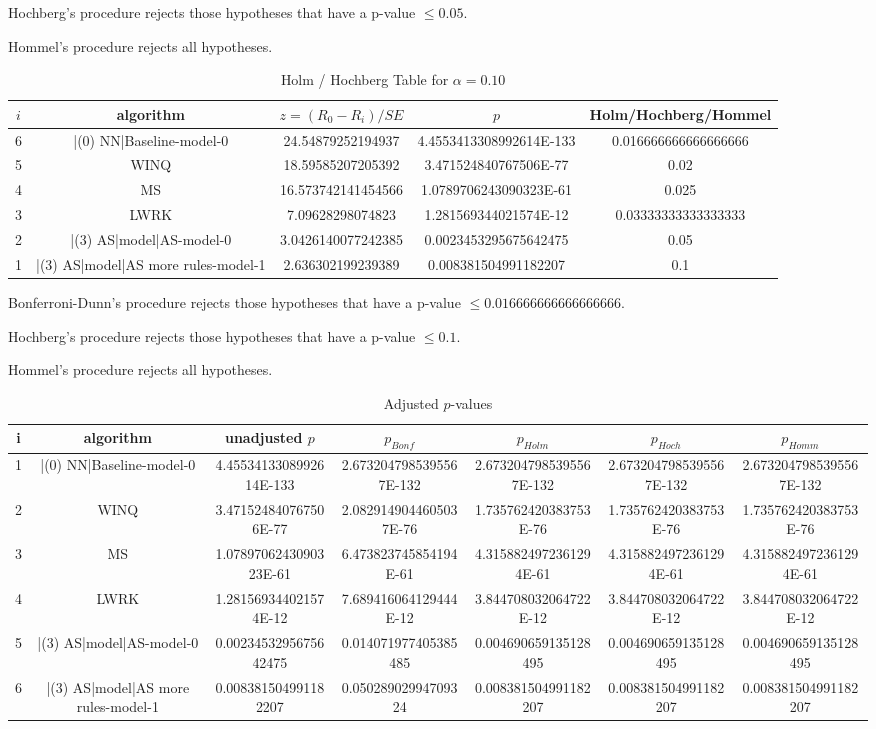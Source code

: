 \documentclass[a3paper,10pt]{article}
\begin{document}
Hochberg's procedure rejects those hypotheses that have a p-value $\le0.05$.


Hommel's procedure rejects all hypotheses.


\begin{table}[!htp]
\centering\tiny
\caption{Holm / Hochberg Table for $\alpha=0.10$}
\begin{tabular}{ccccc}
$i$&algorithm&$z=(R_0 - R_i)/SE$&$p$&Holm/Hochberg/Hommel\\
\hline
6&|(0) NN|Baseline-model-0&24.54879252194937&4.4553413308992614E-133&0.016666666666666666\\
5&WINQ&18.59585207205392&3.471524840767506E-77&0.02\\
4&MS&16.573742141454566&1.0789706243090323E-61&0.025\\
3&LWRK&7.09628298074823&1.281569344021574E-12&0.03333333333333333\\
2&|(3) AS|model|AS-model-0&3.0426140077242385&0.0023453295675642475&0.05\\
1&|(3) AS|model|AS more rules-model-1&2.636302199239389&0.008381504991182207&0.1\\
\hline
\end{tabular}
\end{table}
Bonferroni-Dunn's procedure rejects those hypotheses that have a p-value $\le0.016666666666666666$.


Hochberg's procedure rejects those hypotheses that have a p-value $\le0.1$.


Hommel's procedure rejects all hypotheses.


\begin{table}[!htp]
\centering\tiny
\caption{Adjusted $p$-values}
\begin{tabular}{ccccccc}
i&algorithm&unadjusted $p$&$p_{Bonf}$&$p_{Holm}$&$p_{Hoch}$&$p_{Homm}$\\
\hline
1&|(0) NN|Baseline-model-0&4.4553413308992614E-133&2.6732047985395567E-132&2.6732047985395567E-132&2.6732047985395567E-132&2.6732047985395567E-132\\
2&WINQ&3.471524840767506E-77&2.0829149044605037E-76&1.735762420383753E-76&1.735762420383753E-76&1.735762420383753E-76\\
3&MS&1.0789706243090323E-61&6.473823745854194E-61&4.3158824972361294E-61&4.3158824972361294E-61&4.3158824972361294E-61\\
4&LWRK&1.281569344021574E-12&7.689416064129444E-12&3.844708032064722E-12&3.844708032064722E-12&3.844708032064722E-12\\
5&|(3) AS|model|AS-model-0&0.0023453295675642475&0.014071977405385485&0.004690659135128495&0.004690659135128495&0.004690659135128495\\
6&|(3) AS|model|AS more rules-model-1&0.008381504991182207&0.05028902994709324&0.008381504991182207&0.008381504991182207&0.008381504991182207\\
\hline
\end{tabular}
\end{table}
\end{document}
